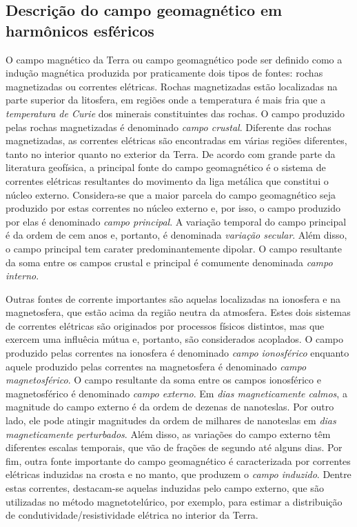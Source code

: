 \documentclass[10pt,a4paper,fleqn]{article}
\begin{document}
\subsection{Descri\c{c}\~{a}o do campo geomagn\'{e}tico em harm\^{o}nicos esf\'{e}ricos}

O campo magn\'{e}tico da Terra ou campo geomagn\'{e}tico pode ser definido
como a indu\c{c}\~{a}o magn\'{e}tica produzida por praticamente dois tipos de
fontes: rochas magnetizadas ou correntes el\'{e}tricas.
Rochas magnetizadas est\~{a}o localizadas na parte superior da litosfera,
em regi\~{o}es onde a temperatura \'{e} mais fria que a \textit{temperatura
de Curie} dos minerais constituintes das rochas.
O campo produzido pelas rochas magnetizadas \'{e} denominado \textit{campo
crustal}.
Diferente das rochas magnetizadas, as correntes el\'{e}tricas s\~{a}o 
encontradas em v\'{a}rias regi\~{o}es diferentes, tanto no interior 
quanto no exterior da Terra.
De acordo com grande parte da literatura geof\'{i}sica, a principal fonte 
do campo geomagn\'{e}tico \'{e} o sistema de correntes el\'{e}tricas 
resultantes do movimento da liga met\'{a}lica que constitui o n\'{u}cleo externo.
Considera-se que a maior parcela do campo geomagn\'{e}tico seja produzido
por estas correntes no n\'{u}cleo externo e, por isso, o campo produzido
por elas \'{e} denominado \textit{campo principal}.
A varia\c{c}\~{a}o temporal do campo principal \'{e} da ordem
de cem anos e, portanto, \'{e} denominada \textit{varia\c{c}\~{a}o
secular}.
Al\'{e}m disso, o campo principal tem carater predominantemente dipolar.
O campo resultante da soma entre os campos crustal e principal \'{e}
comumente denominada \textit{campo interno}.

Outras fontes de corrente importantes s\~{a}o aquelas localizadas
na ionosfera e na magnetosfera, que est\~{a}o acima da regi\~{a}o 
neutra da atmosfera.
Estes dois sistemas de correntes el\'{e}tricas s\~{a}o originados
por processos f\'{i}sicos distintos, mas que exercem uma influ\^{e}cia
m\'{u}tua e, portanto, s\~{a}o considerados acoplados.
O campo produzido pelas correntes na ionosfera \'{e} denominado
\textit{campo ionosf\'{e}rico} enquanto aquele produzido pelas 
correntes na magnetosfera \'{e} denominado \textit{campo 
magnetosf\'{e}rico}.
O campo resultante da soma entre os campos ionosf\'{e}rico e 
magnetosf\'{e}rico \'{e} denominado \textit{campo externo}.
Em \textit{dias magneticamente calmos}, a magnitude do campo
externo \'{e} da ordem de dezenas de nanoteslas.
Por outro lado, ele pode atingir magnitudes da ordem de milhares
de nanoteslas em \textit{dias magneticamente perturbados}.
Al\'{e}m disso, as varia\c{c}\~{o}es do campo externo t\^{e}m 
diferentes escalas temporais, que v\~{a}o de fra\c{c}\~{o}es 
de segundo at\'{e} alguns dias.
Por fim, outra fonte importante do campo geomagn\'{e}tico \'{e} 
caracterizada por correntes el\'{e}tricas induzidas na crosta e no
manto, que produzem o \textit{campo induzido}. Dentre estas
correntes, destacam-se aquelas induzidas pelo campo externo,
que s\~{a}o utilizadas no m\'{e}todo magnetotel\'{u}rico, por 
exemplo, para estimar a distribui\c{c}\~{a}o de 
condutividade/resistividade el\'{e}trica no interior da Terra.
\end{document}
